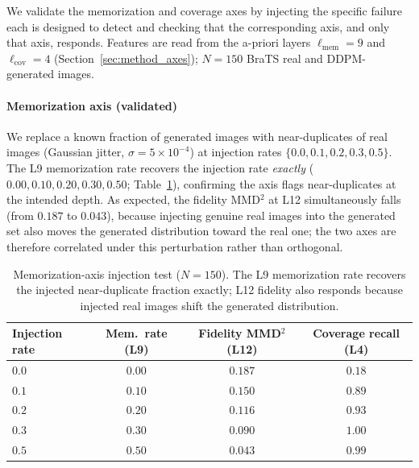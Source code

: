 \documentclass[lettersize,journal]{IEEEtran}
\begin{document}
We validate the memorization and coverage axes by injecting the specific
failure each is designed to detect and checking that the corresponding
axis, and only that axis, responds. Features are read from the a-priori
layers $\ell_{\text{mem}} = 9$ and $\ell_{\text{cov}} = 4$
(Section~\ref{sec:method_axes}); $N = 150$ BraTS real and DDPM-generated
images.

\paragraph{Memorization axis (validated)}
We replace a known fraction of generated images with near-duplicates of
real images (Gaussian jitter, $\sigma = 5\times10^{-4}$) at injection
rates $\{0.0, 0.1, 0.2, 0.3, 0.5\}$. The L9 memorization rate recovers the
injection rate \emph{exactly} ($0.00, 0.10, 0.20, 0.30, 0.50$;
Table~\ref{tab:axes}), confirming the axis flags near-duplicates at the
intended depth. As expected, the fidelity MMD$^2$ at L12 simultaneously
falls (from $0.187$ to $0.043$), because injecting genuine real images into
the generated set also moves the generated distribution toward the real one;
the two axes are therefore correlated under this perturbation rather than
orthogonal.

\begin{table}[t]
\centering
\caption{%
  Memorization-axis injection test ($N = 150$). The L9 memorization rate
  recovers the injected near-duplicate fraction exactly; L12 fidelity also
  responds because injected real images shift the generated distribution.
}
\label{tab:axes}
\begin{tabular}{lccc}
\toprule
Injection rate & Mem.\ rate (L9) & Fidelity MMD$^2$ (L12) & Coverage recall (L4) \\
\midrule
$0.0$ & $0.00$ & $0.187$ & $0.18$ \\
$0.1$ & $0.10$ & $0.150$ & $0.89$ \\
$0.2$ & $0.20$ & $0.116$ & $0.93$ \\
$0.3$ & $0.30$ & $0.090$ & $1.00$ \\
$0.5$ & $0.50$ & $0.043$ & $0.99$ \\
\bottomrule
\end{tabular}
\end{table}
\end{document}
